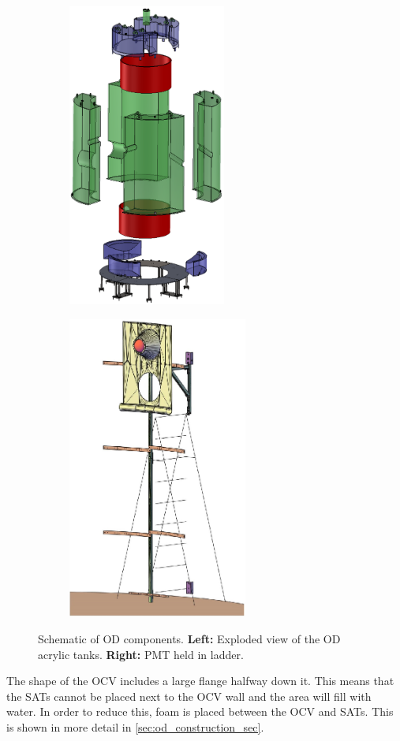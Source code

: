 \begin{figure}[]
  \begin{subfigure}{.5\textwidth}
  \centering
  \includegraphics[height=10cm]{Figures/LZ/OD_Tanks_CAD.png}
  \end{subfigure}
  \begin{subfigure}{.5\textwidth}
  \centering
  \includegraphics[height=10cm]{Figures/LZ/pmt_in_ladder.png}
  \end{subfigure}
\caption{Schematic of OD components. \textbf{Left:} Exploded view of the OD acrylic tanks. \textbf{Right:} PMT held in ladder.}
\label{fig:LZ_OD_schematic}
\end{figure}

\par
The shape of the OCV includes a large flange halfway down it. 
This means that the SATs cannot be placed next to the OCV wall and the area will fill with water.
In order to reduce this, foam is placed between the OCV and SATs.
This is shown in more detail in \autoref{sec:od_construction_sec}.

